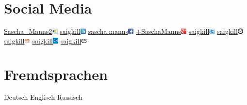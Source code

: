\documentclass[a4paper]{friggeri-cv} %
\begin{document}
\begin{aside}
\section{Social Media}
\href{https://www.xing.com/profile/Sascha\_Manns2}{Sascha\_Manns2}\includegraphics[width=0.3cm]{../Pictures/xing.png}
\href{https://www.linkedin.com/in/saigkill}{saigkill}\includegraphics[width=0.3cm]{../Pictures/linkedin.png}
\href{https://www.facebook.com/sascha.manns}{sascha.manns}\includegraphics[width=0.3cm]{../Pictures/facebook.png}
\href{https://plus.google.com/+SaschaManns}{+SaschaManns}\includegraphics[width=0.3cm]{../Pictures/google-plus.png}
\href{https://twitter.com/saigkill}{saigkill}\includegraphics[width=0.3cm]{../Pictures/twitter.png}
\href{https://wakatime.com/@saigkill}{saigkill}\includegraphics[width=0.3cm]{../Pictures/wakatime.jpg}
\href{https://codealike.com/facts/5028961540}{saigkill}\includegraphics[width=0.3cm]{../Pictures/codealike.png}
\href{https://openhub.net/accounts/saigkill}{saigkill}\includegraphics[width=0.3cm]{../Pictures/openhub.png}
\href{https://codestats.net/users/saigkill}{saigkill}\includegraphics[width=0.3cm]{../Pictures/codestats.png}
\section{Fremdsprachen}
Deutsch 
Englisch 
Russisch 

\end{aside}
\end{document}
